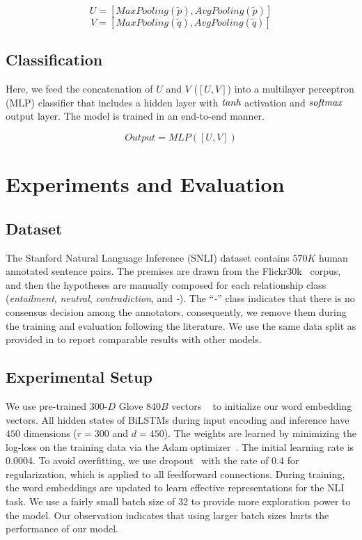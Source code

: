 \documentclass[11pt,a4paper]{article}
\begin{document}
	\begin{equation}
	U = [\textit{MaxPooling}(\tilde{p}), \textit{AvgPooling}(\tilde{p})]
	\label{eq:fixlpool:p}
	\end{equation}
	\begin{equation}
	V = [\textit{MaxPooling}(\tilde{q}), \textit{AvgPooling}(\tilde{q})]
	\label{eq:fixlpool:h}
	\end{equation}
	
	\subsection{Classification}
	Here, we feed the concatenation of $U$ and $V$ ($[U,V]$) into a multilayer perceptron (MLP) classifier that includes a hidden layer with $\emph{tanh}$ activation and $\emph{softmax}$ output layer. The model is trained in an end-to-end manner.
	
	\begin{equation}
	\textit{Output} = \textit{MLP}([U,V])
	\label{eq:mlp}
	\end{equation}
	
		
\section{Experiments and Evaluation}
	
	\subsection{Dataset} \label{sec:data:snli}
	The Stanford Natural Language Inference (SNLI) dataset contains $570K$ human annotated sentence pairs. The premises are drawn from the Flickr30k~\cite{flickr} corpus, and then the hypotheses are manually composed for each relationship class (\emph{entailment}, \emph{neutral}, \emph{contradiction}, and \emph{-}). The ``\emph{-}'' class indicates that there is no consensus decision among the annotators, consequently, we remove them during the training and evaluation following the literature. We use the same data split as provided in \citet{snli} to report comparable results with other models.	
	
	\subsection{Experimental Setup} \label{sec:exp_s}
	We use pre-trained $300$-$D$ Glove $840B$ vectors ~\cite{glove} to initialize our word embedding vectors. All hidden states of BiLSTMs during input encoding and inference have $450$ dimensions ($r=300$ and $d=450$). The weights are learned by minimizing the log-loss on the training data via the Adam optimizer~\cite{adam}. The initial learning rate is 0.0004. To avoid overfitting, we use dropout~\cite{dropout} with the rate of 0.4 for regularization, which is applied to all feedforward connections. During training, the word embeddings are updated to learn effective representations for the NLI task. We use a fairly small batch size of 32 to provide more exploration power to the model. Our observation indicates that using larger batch sizes hurts the performance of our model. 
	
\end{document}
